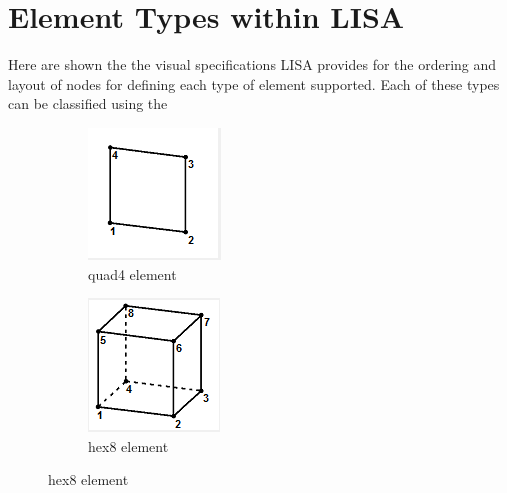 \appendix

\section{Element Types within LISA}
Here are shown the the visual specifications LISA provides for the ordering and layout of nodes for defining each type of element supported. Each of these types can be classified using the 

\begin{figure}[!h]
\centering
\begin{subfigure}{.5\textwidth}
  \centering
  \includegraphics[width=0.3\linewidth]{../Graphics/LISA-quad4.png}
  \caption{quad4 element}
  \label{fig:sub1}
\end{subfigure}%
\begin{subfigure}{.5\textwidth}
  \centering
  \includegraphics[width=0.3\linewidth]{../Graphics/LISA-hex8.png}
  \caption{hex8 element}
  \label{fig:sub2}
\end{subfigure}
\label{fig:test}
\end{figure}


